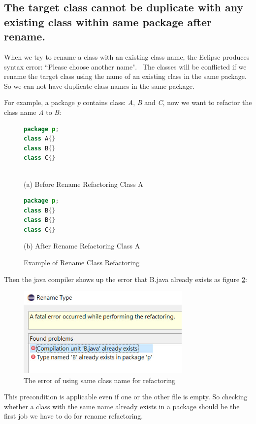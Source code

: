\subsection{The target class cannot be duplicate with any existing class within same package after rename.}

When we try to rename a class with an existing class name, the Eclipse produces syntax error:
``Please choose another name".~\cite{EclipseWebPage} The classes will be conflicted if we rename the target class using the name of an existing class in the same package. So we can not have duplicate class names in the same package. 

For example, a package \textsl{p} contains class: \textsl{A}, \textsl{B} and \textsl{C}, now we want to refactor the class name \textsl{A} to \textsl{B}:

\begin{figure}[th]
\centering
\begin{minipage}[t]{0.6\linewidth}
\begin{lstlisting}[language=java, basicstyle=\scriptsize\ttfamily,frame=single]
package p;
class A{}	
class B{}
class C{}
 
\end{lstlisting}
\tiny{(a) Before Rename Refactoring Class A}
\end{minipage}
\hfill


\begin{minipage}[t]{0.6\linewidth}
\begin{lstlisting}[language=java, basicstyle=\scriptsize\ttfamily,frame=single]
package p;
class B{}	
class B{}
class C{}

\end{lstlisting}
\tiny{(b) After Rename Refactoring Class A}
\end{minipage}
\caption{Example of Rename Class Refactoring}
\label{fig:afterrr}
\end{figure}

Then the java compiler shows up the error that B.java already exists as figure \ref{fig:renameclassname}:

\begin{figure}[H]
\centerline{\includegraphics[width=85mm,scale=0.5]{SCN.jpg}}
\caption{The error of using same class name for refactoring}
\label{fig:renameclassname}
\end{figure}

This precondition is applicable even if one or the other file is empty. So checking whether a class with the same name already exists in a package should be the first job we have to do for rename refactoring. 
